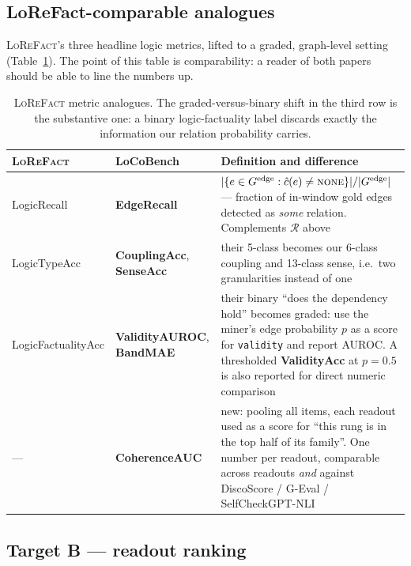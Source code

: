 \documentclass[11pt]{article}
\newcommand{\cNone}{\textsc{none}}
\begin{document}
\subsection{LoReFact-comparable analogues}
\label{sec:analogues}

\textsc{LoReFact}'s three headline logic metrics, lifted to a graded, graph-level setting
(Table~\ref{tab:analogue}). The point of this table is comparability: a reader of both papers
should be able to line the numbers up.

\begin{table}[h]\centering\small
\renewcommand{\arraystretch}{1.15}
\begin{tabular}{@{}llp{7.6cm}@{}}
\toprule
\textbf{\textsc{LoReFact}} & \textbf{LoCoBench} & \textbf{Definition and difference}\\
\midrule
LogicRecall & \textbf{EdgeRecall} &
  $|\{e \in G^{\text{edge}} : \hat c(e) \neq \cNone\}| / |G^{\text{edge}}|$ --- fraction of
  in-window gold edges detected as \emph{some} relation. Complements $\mathcal{R}$ above\\
LogicTypeAcc & \textbf{CouplingAcc}, \textbf{SenseAcc} &
  their 5-class becomes our 6-class coupling and 13-class sense, i.e.\ two granularities
  instead of one\\
LogicFactualityAcc & \textbf{ValidityAUROC}, \textbf{BandMAE} &
  their binary ``does the dependency hold'' becomes graded: use the miner's edge probability
  $p$ as a score for \texttt{validity} and report AUROC. A thresholded
  \textbf{ValidityAcc} at $p{=}0.5$ is also reported for direct numeric comparison\\
\midrule
--- & \textbf{CoherenceAUC} &
  new: pooling all items, each readout used as a score for ``this rung is in the top half of
  its family''. One number per readout, comparable across readouts \emph{and} against
  DiscoScore / G-Eval / SelfCheckGPT-NLI\\
\bottomrule
\end{tabular}
\caption{\textsc{LoReFact} metric analogues. The graded-versus-binary shift in the third row is
the substantive one: a binary logic-factuality label discards exactly the information our
relation probability carries.}
\label{tab:analogue}
\end{table}

\subsection{Target B --- readout ranking}
\label{sec:metrics-b}
\end{document}
